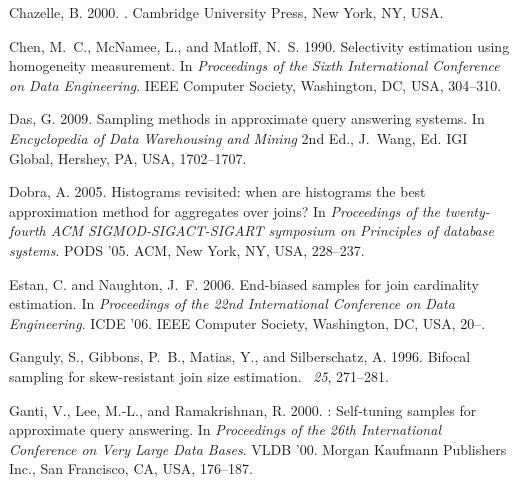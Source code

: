 \begin{thebibliography}{}
{\sc Chazelle, B.} 2000.
.
\newblock Cambridge University Press, New York, NY, USA.

{\sc Chen, M.~C.}, {\sc McNamee, L.}, {\sc and} {\sc Matloff, N.~S.} 1990.
\newblock Selectivity estimation using homogeneity measurement.
\newblock In {\em Proceedings of the Sixth International Conference on Data
  Engineering}. IEEE Computer Society, Washington, DC, USA, 304--310.

{\sc Das, G.} 2009.
\newblock Sampling methods in approximate query answering systems.
\newblock In {\em Encyclopedia of Data Warehousing and Mining\/} 2nd Ed.,
  {J.~Wang}, Ed. IGI Global, Hershey, PA, USA, 1702--1707.

{\sc Dobra, A.} 2005.
\newblock Histograms revisited: when are histograms the best approximation
  method for aggregates over joins?
\newblock In {\em Proceedings of the twenty-fourth ACM SIGMOD-SIGACT-SIGART
  symposium on Principles of database systems}. PODS '05. ACM, New York, NY,
  USA, 228--237.

{\sc Estan, C.} {\sc and} {\sc Naughton, J.~F.} 2006.
\newblock End-biased samples for join cardinality estimation.
\newblock In {\em Proceedings of the 22nd International Conference on Data
  Engineering}. ICDE '06. IEEE Computer Society, Washington, DC, USA, 20--.

{\sc Ganguly, S.}, {\sc Gibbons, P.~B.}, {\sc Matias, Y.}, {\sc and} {\sc
  Silberschatz, A.} 1996.
\newblock Bifocal sampling for skew-resistant join size estimation.
~{\em 25}, 271--281.

{\sc Ganti, V.}, {\sc Lee, M.-L.}, {\sc and} {\sc Ramakrishnan, R.} 2000.
: Self-tuning samples for approximate query answering.
\newblock In {\em Proceedings of the 26th International Conference on Very
  Large Data Bases}. VLDB '00. Morgan Kaufmann Publishers Inc., San Francisco,
  CA, USA, 176--187.


\end{thebibliography}
